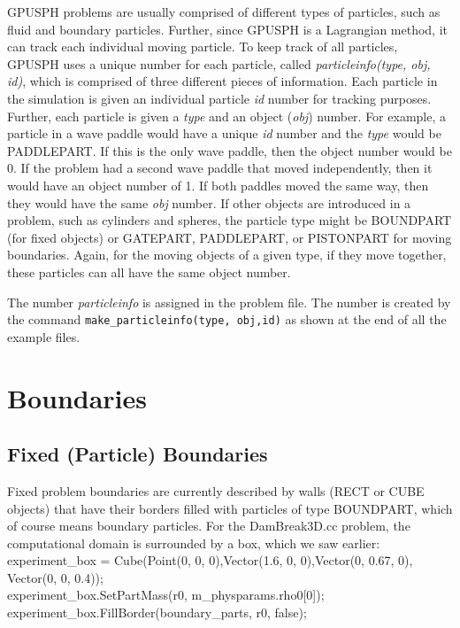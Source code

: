 \documentclass[12pt]{memoir}
\begin{document}
GPUSPH problems are usually comprised of different types of particles,
such as fluid and boundary particles. Further, since GPUSPH is a
Lagrangian method, it can track each individual moving particle. To
keep track of all particles, GPUSPH uses a unique number for each
particle, called {\em particleinfo(type, obj, id)}, which is comprised
of three different pieces of information. Each particle in the
simulation is given an individual particle {\em id} number for tracking
purposes. Further, each particle is given a {\em type} and an object
({\em obj}) number. For example, a particle in a wave paddle would have
a unique {\em id} number and the {\em type} would be PADDLEPART. If
this is the only wave paddle, then the object number would be 0. If the
problem had a second wave paddle that moved independently, then it would
have an object number of 1. If both paddles moved the same way, then
they would have the same {\em obj} number. If other objects are
introduced in a problem, such as cylinders and spheres, the particle
type might be BOUNDPART (for fixed objects) or GATEPART, PADDLEPART, or
PISTONPART for moving boundaries. Again, for the moving objects of a
given type, if they move together, these particles can all have the same
object number.

The number {\em particleinfo} is assigned in the problem file. The
number is created by the command \verb!make_particleinfo(type, obj,id)!
as shown at the end of all the example files.

\section{Boundaries}

\subsection{Fixed (Particle) Boundaries}

Fixed problem boundaries are currently described by walls (RECT or CUBE
objects) that have their borders filled with particles of type
BOUNDPART, which of course means boundary particles. For the
DamBreak3D.cc problem, the computational domain is surrounded by a box,
which we saw earlier: \\

\noindent experiment\_box = Cube(Point(0, 0, 0),Vector(1.6, 0,
0),Vector(0, 0.67, 0), Vector(0, 0, 0.4));\\
experiment\_box.SetPartMass(r0, m\_physparams.rho0[0]);\\
experiment\_box.FillBorder(boundary\_parts, r0, false);\\
\end{document}
